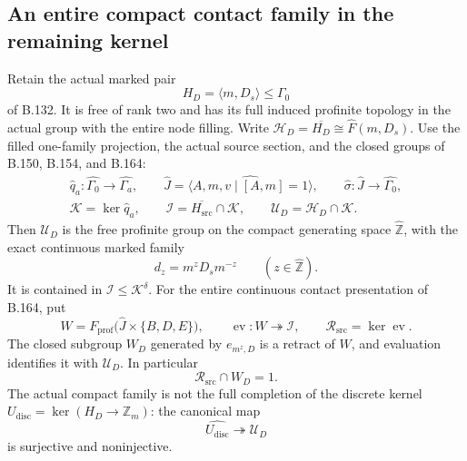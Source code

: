 \subsection*{An entire compact contact family in the remaining kernel}
\label{stmt:B167}
Retain the actual marked pair
\[
 H_D=\langle m,D_s\rangle\le\Gamma_0
\]
of B.132. It is free of rank two and has its full induced profinite
topology in the actual group with the entire node filling.
Write \(\mathcal H_D=\overline{H_D}\cong\widehat F(m,D_s)\).
Use the filled one-family projection, the actual source section, and
the closed groups of B.150, B.154, and B.164:
\[
 \begin{gathered}
 \widehat q_a:\widehat{\Gamma_0}\longrightarrow\widehat{\Gamma_a},
 \qquad
 \widehat J=\widehat{\langle A,m,v\mid[A,m]=1\rangle},
 \qquad
 \widehat\sigma:\widehat J\longrightarrow\widehat{\Gamma_0},\\
 \mathcal K=\ker\widehat q_a,\qquad
 \mathcal I=\overline{H_{\mathrm{src}}}\cap\mathcal K,\qquad
 \mathcal U_D=\mathcal H_D\cap\mathcal K.
 \end{gathered}
\]
Then \(\mathcal U_D\) is the free profinite group on the compact
generating space \(\widehat{\mathbb Z}\), with the exact continuous
marked family
\begin{equation}\label{eq:B167-family}
 d_z=m^zD_sm^{-z}\qquad(z\in\widehat{\mathbb Z}).
\end{equation}
It is contained in \(\mathcal I\le\mathcal K^\delta\).
For the entire continuous contact presentation of B.164, put
\[
 W=F_{\mathrm{prof}}\bigl(\widehat J\times\{B,D,E\}\bigr),
 \qquad \operatorname{ev}:W\twoheadrightarrow\mathcal I,
 \qquad\mathcal R_{\mathrm{src}}=\ker\operatorname{ev}.
\]
The closed subgroup \(W_D\) generated by \(e_{m^z,D}\) is a retract
of \(W\), and evaluation identifies it with \(\mathcal U_D\).
In particular
\begin{equation}\label{eq:B167-restriction}
                 \mathcal R_{\mathrm{src}}\cap W_D=1.
\end{equation}
The actual compact family is not the full completion of the discrete
kernel \(U_{\mathrm{disc}}=\ker(H_D\to\mathbb Z_m)\):
the canonical map
\begin{equation}\label{eq:B167-not-completion}
        \widehat{U_{\mathrm{disc}}}\twoheadrightarrow\mathcal U_D
\end{equation}
is surjective and noninjective.

